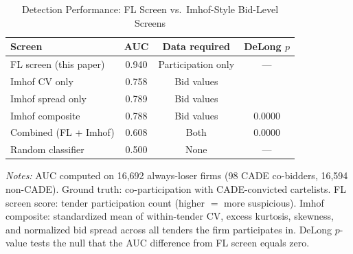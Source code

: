 \begin{table}[htbp]
\centering
\caption{Detection Performance: FL Screen vs.\ Imhof-Style Bid-Level Screens}
\label{tab:imhof_comparison}
\begin{threeparttable}
\small
\begin{tabular}{lccc}
\toprule
Screen & AUC & Data required & DeLong $p$ \\
\midrule
FL screen (this paper) & 0.940 & Participation only & --- \\
Imhof CV only & 0.758 & Bid values & \\
Imhof spread only & 0.789 & Bid values & \\
Imhof composite & 0.788 & Bid values & 0.0000 \\
Combined (FL + Imhof) & 0.608 & Both & 0.0000 \\
Random classifier & 0.500 & None & --- \\
\bottomrule
\end{tabular}
\begin{tablenotes}
\small
\item \textit{Notes:} AUC computed on 16,692 always-loser firms
(98 CADE co-bidders, 16,594 non-CADE).
Ground truth: co-participation with CADE-convicted cartelists.
FL screen score: tender participation count (higher $=$ more suspicious).
Imhof composite: standardized mean of within-tender CV, excess kurtosis,
skewness, and normalized bid spread across all tenders the firm participates in.
DeLong $p$-value tests the null that the AUC difference from FL screen equals zero.
\end{tablenotes}
\end{threeparttable}
\end{table}
